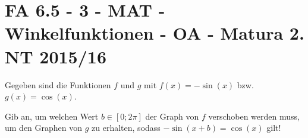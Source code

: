 \section{FA 6.5 - 3 - MAT - Winkelfunktionen - OA - Matura 2. NT 2015/16}

\begin{beispiel}[FA 6.5]{1} %
Gegeben sind die Funktionen $f$ und $g$ mit $f(x)=-\sin(x)$ bzw. $g(x)=\cos(x)$.

Gib an, um welchen Wert $b\in\left[0;2\pi\right]$ der Graph von $f$ verschoben werden muss, um den Graphen von $g$ zu erhalten, sodass $-\sin(x+b)=\cos(x)$ gilt!

\end{beispiel}
